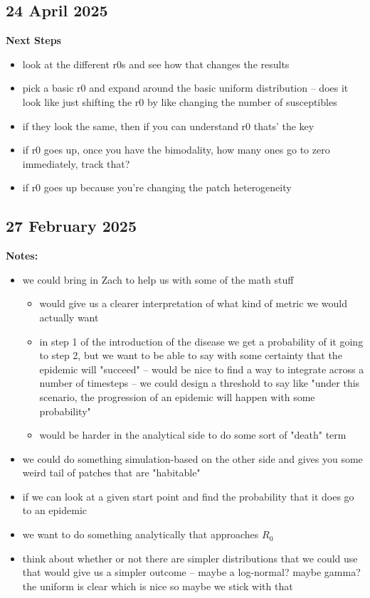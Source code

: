 \documentclass[12pt]{article}%
\begin{document}
\subsection{24 April 2025}

\textbf{Next Steps}
\begin{itemize}
    \item look at the different r0s and see how that changes the results
    \item pick a basic r0 and expand around the basic uniform distribution -- does it look like just shifting the r0 by like changing the number of susceptibles 
    \item if they look the same, then if you can understand r0 thats' the key 
    \item if r0 goes up, once you have the bimodality, how many ones go to zero immediately, track that? 
    \item if r0 goes up because you're changing the patch heterogeneity
\end{itemize}

\subsection{27 February 2025}

\textbf{Notes:}
\begin{itemize}
    \item  we could bring in Zach to help us with some of the math stuff 
    \begin{itemize}
        \item would give us a clearer interpretation of what kind of metric we would actually want 
        \item in step 1 of the introduction of the disease we get a probability of it going to step 2, but we want to be able to say with some certainty that the epidemic will "succeed" -- would be nice to find a way to integrate across a number of timesteps -- we could design a threshold to say like "under this scenario, the progression of an epidemic will happen with some probability"
        \item would be harder in the analytical side to do some sort of "death" term 
    \end{itemize}
    \item we could do something simulation-based on the other side and gives you some weird tail of patches that are "habitable" 
    \item if we can look at a given start point and find the probability that it does go to an epidemic
    \item we want to do something analytically that approaches $R_0$
    \item think about whether or not there are simpler distributions that we could use that would give us a simpler outcome -- maybe a log-normal? maybe gamma? the uniform is clear which is nice so maybe we stick with that 
    \begin{figure}[!hpt]
        \centering
        \caption{}
    \end{figure}
\end{itemize}
\end{document}

